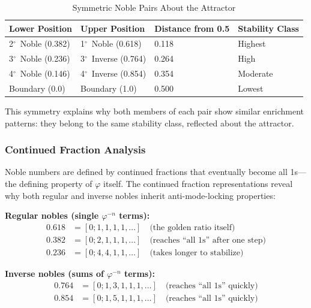 \documentclass[11pt,a4paper]{article}
\newcommand{\degree}{$^\circ$}  %
\newcommand{\phisym}{\varphi}
\begin{document}
\begin{table}[H]
\centering
\caption{Symmetric Noble Pairs About the Attractor}
\label{tab:symmetric_pairs}
\begin{tabular}{@{}llll@{}}
\toprule
Lower Position & Upper Position & Distance from 0.5 & Stability Class \\
\midrule
2\degree\ Noble (0.382) & 1\degree\ Noble (0.618) & 0.118 & Highest \\
3\degree\ Noble (0.236) & 3\degree\ Inverse (0.764) & 0.264 & High \\
4\degree\ Noble (0.146) & 4\degree\ Inverse (0.854) & 0.354 & Moderate \\
Boundary (0.0) & Boundary (1.0) & 0.500 & Lowest \\
\bottomrule
\end{tabular}
\end{table}

This symmetry explains why both members of each pair show similar enrichment patterns: they belong to the same stability class, reflected about the attractor.

\subsubsection{Continued Fraction Analysis}
\label{sec:continued_fractions}

Noble numbers are defined by continued fractions that eventually become all 1s---the defining property of $\phisym$ itself. The continued fraction representations reveal why both regular and inverse nobles inherit anti-mode-locking properties:

\textbf{Regular nobles (single $\phisym^{-n}$ terms):}
\begin{align}
0.618 &= [0; 1, 1, 1, 1, \ldots] \quad \text{(the golden ratio itself)} \\
0.382 &= [0; 2, 1, 1, 1, \ldots] \quad \text{(reaches ``all 1s'' after one step)} \\
0.236 &= [0; 4, 4, 1, 1, \ldots] \quad \text{(takes longer to stabilize)}
\end{align}

\textbf{Inverse nobles (sums of $\phisym^{-n}$ terms):}
\begin{align}
0.764 &= [0; 1, 3, 1, 1, 1, \ldots] \quad \text{(reaches ``all 1s'' quickly)} \\
0.854 &= [0; 1, 5, 1, 1, 1, \ldots] \quad \text{(reaches ``all 1s'' quickly)}
\end{align}
\end{document}
